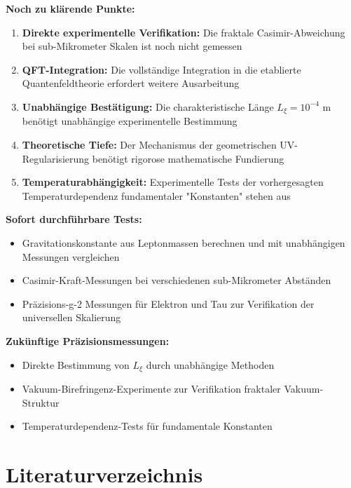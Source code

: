 \documentclass[12pt,a4paper]{article}
\theoremstyle{remark}
\begin{document}
\begin{critical}
	\textbf{Noch zu klärende Punkte:}
	\begin{enumerate}
		\item \textbf{Direkte experimentelle Verifikation:} Die fraktale Casimir-Abweichung bei sub-Mikrometer Skalen ist noch nicht gemessen
		\item \textbf{QFT-Integration:} Die vollständige Integration in die etablierte Quantenfeldtheorie erfordert weitere Ausarbeitung
		\item \textbf{Unabhängige Bestätigung:} Die charakteristische Länge $L_\xi = 10^{-4}$ m benötigt unabhängige experimentelle Bestimmung
		\item \textbf{Theoretische Tiefe:} Der Mechanismus der geometrischen UV-Regularisierung benötigt rigorose mathematische Fundierung
		\item \textbf{Temperaturabhängigkeit:} Experimentelle Tests der vorhergesagten Temperaturdependenz fundamentaler "Konstanten" stehen aus
	\end{enumerate}
\end{critical}

\begin{important}[title=Experimentelle Teststrategien]
	\textbf{Sofort durchführbare Tests:}
	\begin{itemize}
		\item Gravitationskonstante aus Leptonmassen berechnen und mit unabhängigen Messungen vergleichen
		\item Casimir-Kraft-Messungen bei verschiedenen sub-Mikrometer Abständen
		\item Präzisions-g-2 Messungen für Elektron und Tau zur Verifikation der universellen Skalierung
	\end{itemize}
	
	\textbf{Zukünftige Präzisionsmessungen:}
	\begin{itemize}
		\item Direkte Bestimmung von $L_\xi$ durch unabhängige Methoden
		\item Vakuum-Birefringenz-Experimente zur Verifikation fraktaler Vakuum-Struktur
		\item Temperaturdependenz-Tests für fundamentale Konstanten
	\end{itemize}
\end{important}

\section{Literaturverzeichnis}
\end{document}
